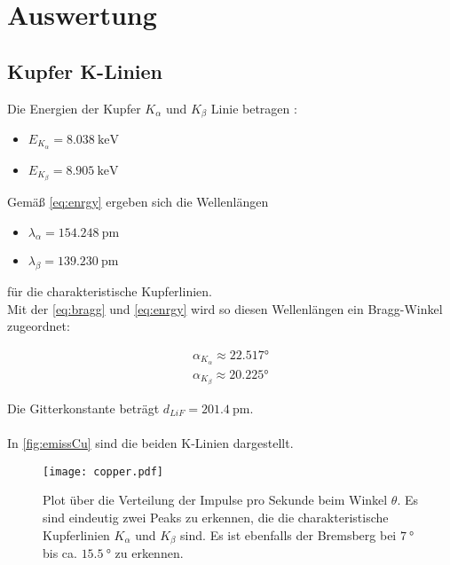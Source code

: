 \section{Auswertung}
\label{sec:Auswertung}

\subsection{Kupfer K-Linien}

Die Energien der Kupfer $K_{\alpha}$ und $K_{\beta}$ Linie betragen \cite{kline}:

\begin{itemize}
  \item $E_{K_{\alpha}} = \SI{8.038}{\kilo\electronvolt}$
  \item $E_{K_{\beta}} = \SI{8.905}{\kilo\electronvolt}$
\end{itemize}

Gemäß \autoref{eq:enrgy} ergeben sich die Wellenlängen

\begin{itemize}
  \item $\lambda_{\alpha} = \SI{154.248}{\pico\metre}$
  \item $\lambda_{\beta} = \SI{139.230}{\pico\metre}$
\end{itemize}

für die charakteristische Kupferlinien.\\
Mit der \autoref{eq:bragg} und \autoref{eq:enrgy} wird so diesen Wellenlängen ein Bragg-Winkel zugeordnet:

\begin{align*}
  \alpha_{K_{\alpha}} \approx \ang{22.517}\\
  \alpha_{K_{\beta}} \approx \ang{20.225}
\end{align*}

Die Gitterkonstante beträgt $d_{LiF} = \SI{201.4}{\pico\metre}$.\\
\\
In \autoref{fig:emissCu} sind die beiden K-Linien dargestellt.

\begin{figure}[htbp]
  \centering
  \texttt{[image: copper.pdf]}
  \caption{Plot über die Verteilung der Impulse pro Sekunde beim Winkel $\theta$. Es sind eindeutig zwei Peaks zu erkennen, die die charakteristische Kupferlinien $K_\alpha$ und $K_{\beta}$ sind. Es ist ebenfalls der Bremsberg bei $\SI{7}{\degree}$ bis ca. $\SI{15.5}{\degree}$ zu erkennen.}
  \label{fig:emissCu}
\end{figure}

